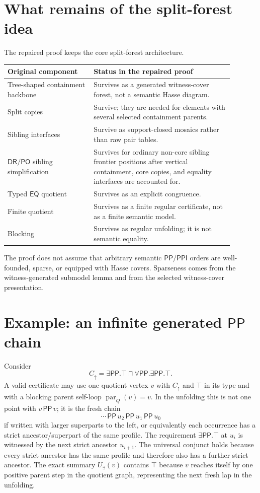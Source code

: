 \documentclass[11pt]{article}
\theoremstyle{remark}
\newcommand{\DR}{\mathsf{DR}}
\newcommand{\PO}{\mathsf{PO}}
\newcommand{\PP}{\mathsf{PP}}
\newcommand{\PPI}{\mathsf{PPI}}
\newcommand{\EQ}{\mathsf{EQ}}
\newcommand{\parr}{\operatorname{par}}
\begin{document}
\section{What remains of the split-forest idea}
The repaired proof keeps the core split-forest architecture.
\begin{center}
\begin{tabular}{p{0.34\linewidth}p{0.55\linewidth}}
\toprule
Original component & Status in the repaired proof \\
\midrule
Tree-shaped containment backbone & Survives as a generated witness-cover forest, not a semantic Hasse diagram. \\
Split copies & Survive; they are needed for elements with several selected containment parents. \\
Sibling interfaces & Survive as support-closed mosaics rather than raw pair tables. \\
$\DR/\PO$ sibling simplification & Survives for ordinary non-core sibling frontier positions after vertical containment, core copies, and equality interfaces are accounted for. \\
Typed $\EQ$ quotient & Survives as an explicit congruence. \\
Finite quotient & Survives as a finite regular certificate, not as a finite semantic model. \\
Blocking & Survives as regular unfolding; it is not semantic equality. \\
\bottomrule
\end{tabular}
\end{center}

The proof does not assume that arbitrary semantic $\PP/\PPI$ orders are well-founded, sparse, or equipped with Hasse covers.  Sparseness comes from the witness-generated submodel lemma and from the selected witness-cover presentation.

\appendix
\section{Example: an infinite generated $\PP$ chain}
Consider
\[
C_\uparrow=\exists\PP.\top\sqcap\forall\PP.\exists\PP.\top.
\]
A valid certificate may use one quotient vertex $v$ with $C_\uparrow$ and $\top$ in its type and with a blocking parent self-loop $\parr_Q(v)=v$.  In the unfolding this is not one point with $v\,\PP\,v$; it is the fresh chain
\[
\cdots\,\PP\,u_2\,\PP\,u_1\,\PP\,u_0
\]
if written with larger superparts to the left, or equivalently each occurrence has a strict ancestor/superpart of the same profile.  The requirement $\exists\PP.\top$ at $u_i$ is witnessed by the next strict ancestor $u_{i+1}$.  The universal conjunct holds because every strict ancestor has the same profile and therefore also has a further strict ancestor.  The exact summary $U_\exists(v)$ contains $\top$ because $v$ reaches itself by one positive parent step in the quotient graph, representing the next fresh lap in the unfolding.
\end{document}
